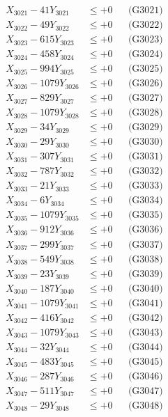 \documentclass[a4paper,10pt]{article}
\begin{document}
{\begin{align}
\allowbreak
X_{3021} - 41Y_{3021} &\leq +0 && \text{(G3021)} \\
X_{3022} - 49Y_{3022} &\leq +0 && \text{(G3022)} \\
X_{3023} - 615Y_{3023} &\leq +0 && \text{(G3023)} \\
X_{3024} - 458Y_{3024} &\leq +0 && \text{(G3024)} \\
X_{3025} - 994Y_{3025} &\leq +0 && \text{(G3025)} \\
X_{3026} - 1079Y_{3026} &\leq +0 && \text{(G3026)} \\
X_{3027} - 829Y_{3027} &\leq +0 && \text{(G3027)} \\
X_{3028} - 1079Y_{3028} &\leq +0 && \text{(G3028)} \\
X_{3029} - 34Y_{3029} &\leq +0 && \text{(G3029)} \\
X_{3030} - 29Y_{3030} &\leq +0 && \text{(G3030)} \\
\allowbreak
X_{3031} - 307Y_{3031} &\leq +0 && \text{(G3031)} \\
X_{3032} - 787Y_{3032} &\leq +0 && \text{(G3032)} \\
X_{3033} - 21Y_{3033} &\leq +0 && \text{(G3033)} \\
X_{3034} - 6Y_{3034} &\leq +0 && \text{(G3034)} \\
X_{3035} - 1079Y_{3035} &\leq +0 && \text{(G3035)} \\
X_{3036} - 912Y_{3036} &\leq +0 && \text{(G3036)} \\
X_{3037} - 299Y_{3037} &\leq +0 && \text{(G3037)} \\
X_{3038} - 549Y_{3038} &\leq +0 && \text{(G3038)} \\
X_{3039} - 23Y_{3039} &\leq +0 && \text{(G3039)} \\
X_{3040} - 187Y_{3040} &\leq +0 && \text{(G3040)} \\
\allowbreak
X_{3041} - 1079Y_{3041} &\leq +0 && \text{(G3041)} \\
X_{3042} - 416Y_{3042} &\leq +0 && \text{(G3042)} \\
X_{3043} - 1079Y_{3043} &\leq +0 && \text{(G3043)} \\
X_{3044} - 32Y_{3044} &\leq +0 && \text{(G3044)} \\
X_{3045} - 483Y_{3045} &\leq +0 && \text{(G3045)} \\
X_{3046} - 287Y_{3046} &\leq +0 && \text{(G3046)} \\
X_{3047} - 511Y_{3047} &\leq +0 && \text{(G3047)} \\
X_{3048} - 29Y_{3048} &\leq +0 && \text{(G3048)} \\

\end{align}}
\end{document}
